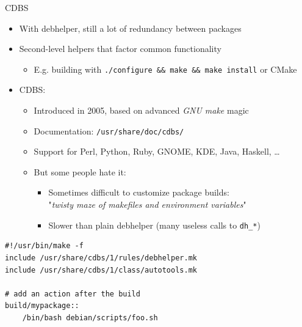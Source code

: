 \documentclass[10pt,final]{beamer}
\begin{document}
\begin{frame}[fragile=singleslide]{CDBS}
  \hbr
  \begin{itemize}
  \item With debhelper, still a lot of redundancy between packages
    \hbr
  \item Second-level helpers that factor common functionality
    \begin{itemize}
    \item E.g. building with \texttt{./configure \&\& make \&\& make install} or CMake
    \end{itemize}
    \hbr
  \item CDBS:
    \begin{itemize}
    \item Introduced in 2005, based on advanced \textsl{GNU make} magic
    \item Documentation: \texttt{/usr/share/doc/cdbs/}
    \item Support for Perl, Python, Ruby, GNOME, KDE, Java, Haskell, \ldots
    \item But some people hate it:
      \begin{itemize}
      \item Sometimes difficult to customize package builds:\\
        "\textsl{twisty maze of makefiles and environment variables}"
      \item Slower than plain debhelper (many useless calls to \texttt{dh\_*})
      \end{itemize}
    \end{itemize}
  \end{itemize}
  \seprule
      \begin{lstlisting}[basicstyle=\ttfamily\footnotesize,escapeinside=\{\}]
#!/usr/bin/make -f
include /usr/share/cdbs/1/rules/debhelper.mk
include /usr/share/cdbs/1/class/autotools.mk

# add an action after the build
build/mypackage::
    /bin/bash debian/scripts/foo.sh
      \end{lstlisting}
\end{frame}
\end{document}

